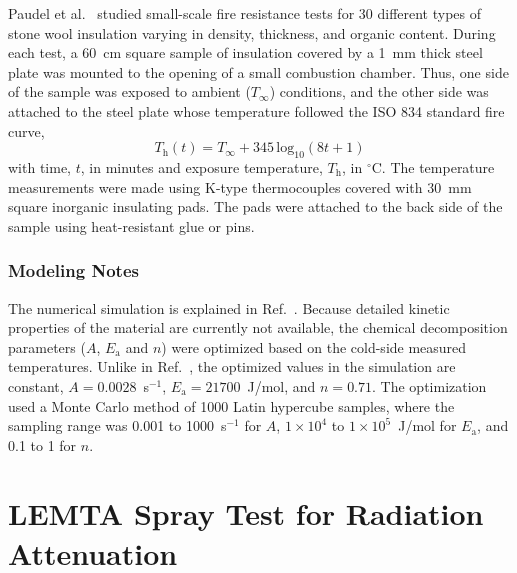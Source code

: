 Paudel et al.~\cite{Paudel:2020} studied small-scale fire resistance tests for 30 different types of stone wool insulation varying in density, thickness, and organic content. During each test, a 60~cm square sample of insulation covered by a 1~mm thick steel plate was mounted to the opening of a small combustion chamber. Thus, one side of the sample was exposed to ambient ($ T_\infty $) conditions, and the other side was attached to the steel plate whose temperature followed the ISO 834 standard fire curve,
\begin{equation}
   T_\textrm{h}(t) = T_\infty + 345 \, \textrm{log}_{10}(8t + 1)
   \label{eq:isocurve}
\end{equation}
with time, $t$, in minutes and exposure temperature, $T_{\textrm{h}}$, in $^\circ$C. The temperature measurements were made using K-type thermocouples covered with 30~mm square inorganic insulating pads. The pads were attached to the back side of the sample using heat-resistant glue or pins.

\subsubsection{Modeling Notes}

The numerical simulation is explained in Ref.~\cite{Paudel:2020}. Because detailed kinetic properties of the material are currently not available, the chemical decomposition parameters ($A$, $E_{\textrm{a}}$ and $n$) were optimized based on the cold-side measured temperatures. Unlike in Ref.~\cite{Paudel:2020}, the optimized values in the simulation are constant, $A=0.0028$~s$^{-1}$, $E_{\textrm{a}}=21700$~J/mol, and $n=0.71$. The optimization used a Monte Carlo method of 1000 Latin hypercube samples, where the sampling range was 0.001 to 1000~s$^{-1}$ for $A$, $1\times10^4$ to $1\times10^5$~J/mol for $E_{\textrm{a}}$, and 0.1 to 1 for $n$.

\section{LEMTA Spray Test for Radiation Attenuation}
\label{LEMTA_Spray_Description}


